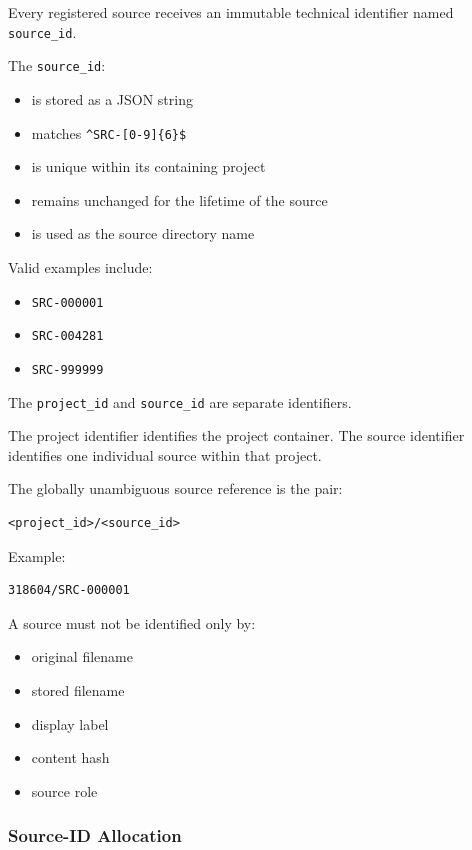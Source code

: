 Every registered source receives an immutable technical identifier named \texttt{source\_id}.

The \texttt{source\_id}:

\begin{itemize}
\tightlist
\item
  is stored as a JSON string
\item
  matches \texttt{\^{}SRC-{[}0-9{]}\{6\}\$}
\item
  is unique within its containing project
\item
  remains unchanged for the lifetime of the source
\item
  is used as the source directory name
\end{itemize}

Valid examples include:

\begin{itemize}
\tightlist
\item
  \texttt{SRC-000001}
\item
  \texttt{SRC-004281}
\item
  \texttt{SRC-999999}
\end{itemize}

The \texttt{project\_id} and \texttt{source\_id} are separate identifiers.

The project identifier identifies the project container. The source identifier identifies one individual source within that project.

The globally unambiguous source reference is the pair:

\begin{verbatim}
<project_id>/<source_id>
\end{verbatim}

Example:

\begin{verbatim}
318604/SRC-000001
\end{verbatim}

A source must not be identified only by:

\begin{itemize}
\tightlist
\item
  original filename
\item
  stored filename
\item
  display label
\item
  content hash
\item
  source role
\end{itemize}

\hypertarget{source-id-allocation}{%
\subsubsection{Source-ID Allocation}\label{source-id-allocation}}

